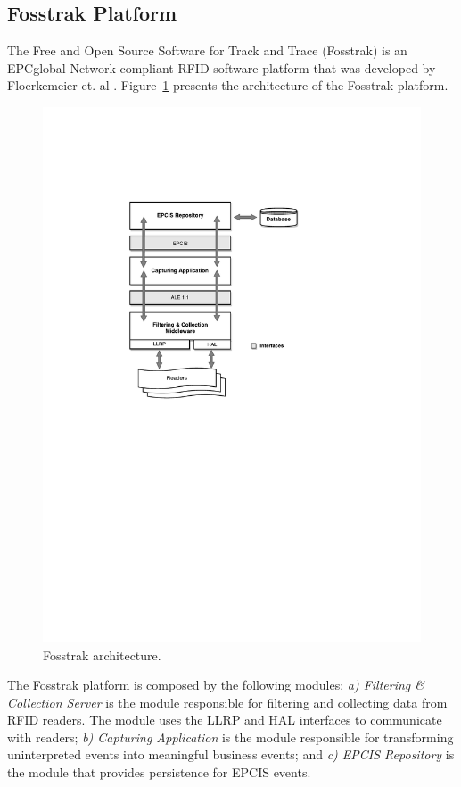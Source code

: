 \subsection{Fosstrak Platform}
\label{sub:fosstrak}
The Free and Open Source Software for Track and Trace (Fosstrak) is an EPCglobal Network compliant
\gls{RFID} software platform that was developed by Floerkemeier et. al \cite{floerkemeier2007rfid}.
Figure~\ref{fig:fosstrak_architecture} presents the architecture of the Fosstrak platform.

\begin{figure}[ht!]
  \centering
  \includegraphics[width=.45\textwidth]{./figures/fosstrak_architecture}
  \caption[Fosstrak architecture.]{Fosstrak architecture.}
  \label{fig:fosstrak_architecture}
\end{figure}

The Fosstrak platform is composed by the following modules: \textit{a) Filtering \& Collection Server}
is the module responsible for filtering and collecting data from \gls{RFID} readers. The module uses the
\gls{LLRP} and \gls{HAL} interfaces to communicate with readers; \textit{b) Capturing Application} is
the module responsible for transforming uninterpreted events into meaningful business events; and
\textit{c) EPCIS Repository} is the module that provides persistence for \gls{EPCIS} events.
